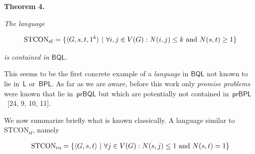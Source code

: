 

\par\medskip\noindent\textbf{
\textbf{Theorem 4}\textbf{.}
}\par



\emph{The language}\par


\[\begin{gathered}
\displaystyle\mathrm{STCON}_{\mathrm{sf}}=\{\langle G,s,t,1^{k}\rangle\nobreak\ |\nobreak\ \forall i,j\in V(G):N(i,j)\leq k\text{ and }N(s,t)\geq 1\}
\end{gathered}\]


\emph{is contained in $\mathsf{BQL}$.}\par






This seems to be the first concrete example of a \emph{language} in $\mathsf{BQL}$ not known to lie in $\mathsf{L}$ or $\mathsf{BPL}$.
As far as we are aware, before this work only \emph{promise problems} were known that lie in $\mathsf{prBQL}$ but which are potentially not contained in $\mathsf{prBPL}$ [24, 9, 10, 11].\par




We now summarize briefly what is known classically.
A language similar to $\mathrm{STCON}_{\mathrm{sf}}$, namely\par


\[\begin{gathered}
\displaystyle\mathrm{STCON}_{\mathrm{ru}}=\{\langle G,s,t\rangle\nobreak\ |\nobreak\ \forall j\in V(G):N(s,j)\leq 1\text{ and }N(s,t)=1\}
\end{gathered}\]


